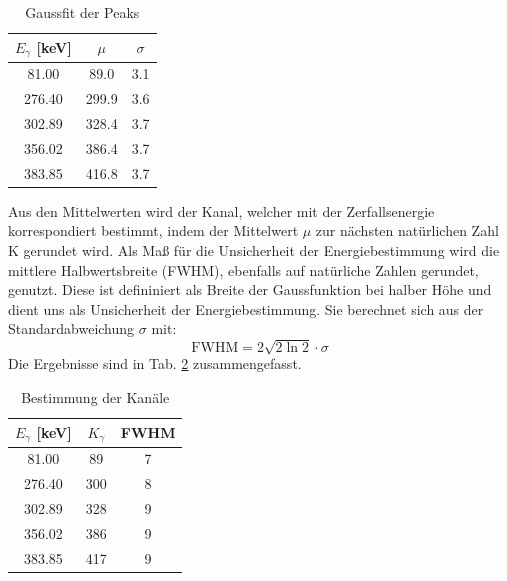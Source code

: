 \begin{table}[h]
\centering
\begin{tabular}{|c | c |c |}
\hline
$E_{\gamma}$ [\si{\kilo\electronvolt}]  & $\mu$ & $\sigma$ \\
\hline
81.00 & 89.0 & 3.1 \\
276.40 & 299.9 & 3.6 \\
302.89 & 328.4 & 3.7 \\
356.02 & 386.4 & 3.7 \\
383.85 & 416.8 & 3.7 \\
\hline
\end{tabular}
\caption{Gaussfit der Peaks}
\label{peaks}
\end{table}

Aus den Mittelwerten wird der Kanal, welcher mit der Zerfallsenergie korrespondiert bestimmt, indem der Mittelwert $\mu$ zur nächsten natürlichen Zahl K gerundet wird.
Als Maß für die Unsicherheit der Energiebestimmung wird die mittlere Halbwertsbreite (FWHM), ebenfalls auf natürliche Zahlen gerundet, genutzt.
Diese ist defininiert als Breite der Gaussfunktion bei halber Höhe und dient uns als Unsicherheit der Energiebestimmung.
Sie berechnet sich aus der Standardabweichung $\sigma$ mit:
\begin{equation}
\text{FWHM} = 2 \sqrt{2 \ln{2}} \cdot \sigma
\end{equation}
Die Ergebnisse sind in Tab. \ref{kanal} zusammengefasst.

\begin{table}[h]
\centering
\begin{tabular}{|c | c |c |}
\hline
$E_{\gamma}$ [\si{\kilo\electronvolt}]  & $K_{\gamma}$ & FWHM \\
\hline
81.00 & 89 & 7 \\
276.40 & 300 & 8 \\
302.89 & 328 & 9 \\
356.02 & 386 & 9 \\
383.85 & 417 & 9 \\
\hline
\end{tabular}
\caption{Bestimmung der Kanäle}
\label{kanal}
\end{table}

